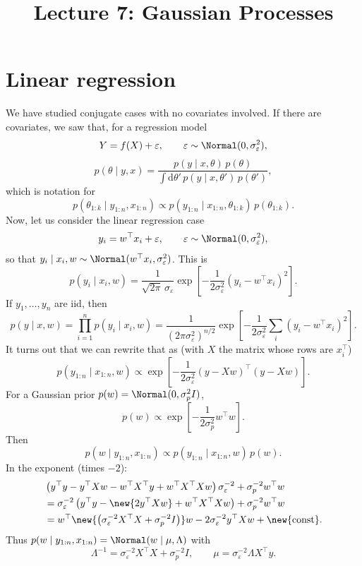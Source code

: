 
\title{Lecture 7: Gaussian Processes}
\author{}\date{}
\newcommand{\xt}{\tilde x}
\newcommand{\yt}{\tilde y}


\maketitle

\section{Linear regression}
We have studied conjugate cases with no covariates involved. If there are covariates, we saw that, for a regression model
\[
Y = f(X) + \varepsilon, \qquad \varepsilon \sim \Normal(0, \sigma_\varepsilon^2),
\]
\[
p(\theta \mid y, x) = \frac{p(y \mid x, \theta)\,p(\theta)}{\int \mathrm{d}\theta'\,p(y \mid x, \theta')\,p(\theta')},
\]
which is notation for
\[
p(\theta_{1:k} \mid y_{1:n}, x_{1:n}) \propto p(y_{1:n} \mid x_{1:n}, \theta_{1:k})\,p(\theta_{1:k}).
\]
Now, let us consider the linear regression case
\[
y_i = w^{\top}x_i + \varepsilon, \qquad \varepsilon \sim \Normal(0, \sigma_\varepsilon^2),
\]
so that $y_i \mid x_i, w \sim \Normal(w^{\top}x_i, \sigma_\varepsilon^2)$. This is
\[
p(y_i \mid x_i, w) = \frac{1}{\sqrt{2\pi}\,\sigma_\varepsilon}\exp\left[-\frac{1}{2\sigma_\varepsilon^2}(y_i - w^{\top}x_i)^2\right].
\]
If $y_1, \dots, y_n$ are iid, then
\[
p(y \mid x, w) = \prod_{i=1}^{n}p(y_i \mid x_i, w) = \frac{1}{(2\pi\sigma_\varepsilon^2)^{n/2}}\exp\left[-\frac{1}{2\sigma_\varepsilon^2}\sum_i(y_i - w^{\top}x_i)^2\right].
\]
It turns out that we can rewrite that as (with $X$ the matrix whose rows are $x_i^{\top}$)
\[
p(y_{1:n} \mid x_{1:n}, w) \propto \exp\left[-\frac{1}{2\sigma_\varepsilon^2}(y - Xw)^{\top}(y - Xw)\right].
\]
For a Gaussian prior $p(w) = \Normal(0, \sigma_p^2I)$,
\[
p(w) \propto \exp\left[-\frac{1}{2\sigma_p^2}w^{\top}w\right].
\]
Then
\[
p(w \mid y_{1:n}, x_{1:n}) \propto p(y_{1:n} \mid x_{1:n}, w)\,p(w).
\]
In the exponent (times $-2$):
\begin{align*}
&\left(y^{\top}y - y^{\top}Xw - w^{\top}X^{\top}y + w^{\top}X^{\top}Xw\right)\sigma_\varepsilon^{-2} + \sigma_p^{-2}w^{\top}w\\
&= \sigma_\varepsilon^{-2}\left(y^{\top}y - \new{2y^{\top}Xw} + w^{\top}X^{\top}Xw\right) + \sigma_p^{-2}w^{\top}w\\
&= w^{\top}\new{\left(\sigma_\varepsilon^{-2}X^{\top}X + \sigma_p^{-2}I\right)}w - 2\sigma_\varepsilon^{-2}y^{\top}Xw + \new{\text{const}}.
\end{align*}
Thus $p(w \mid y_{1:n}, x_{1:n}) = \Normal(w \mid \mu, \Lambda)$ with
\[
\Lambda^{-1} = \sigma_\varepsilon^{-2}X^{\top}X + \sigma_p^{-2}I,
\qquad
\mu = \sigma_\varepsilon^{-2}\Lambda X^{\top}y.
\]


